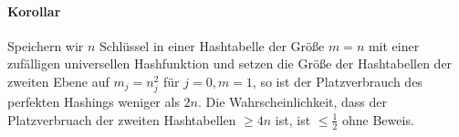 \paragraph{Korollar}
Speichern wir $n$ Schlüssel in einer Hashtabelle der Größe $m=n$ mit einer zufälligen universellen Hashfunktion und setzen die Größe der Hashtabellen der zweiten Ebene auf $m_j=n_j^2$ für $j=0, m=1$, so ist der Platzverbrauch des perfekten Hashings weniger als $2n$. Die Wahrscheinlichkeit, dass der Platzverbruach der zweiten Hashtabellen $\geq 4n$ ist, ist $\leq \frac{1}{2}$ ohne Beweis.